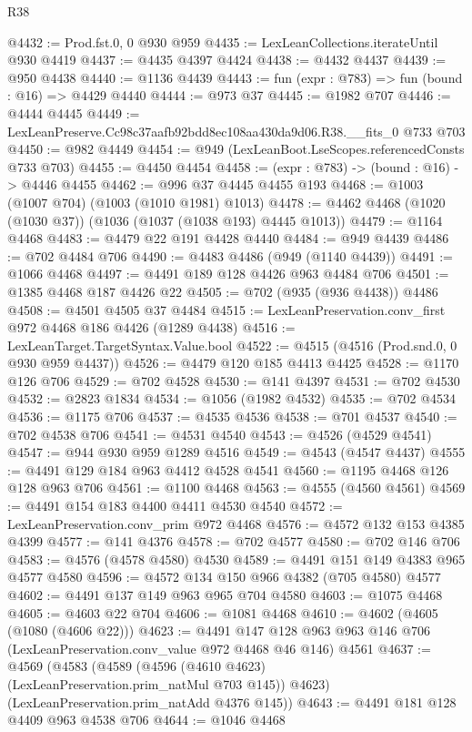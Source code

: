 \begin{lexlean}{R38}
\begin{coremodule}
@4432 := Prod.fst.{0, 0} @930 @959
@4435 := LexLeanCollections.iterateUntil @930 @4419
@4437 := @4435 @4397 @4424
@4438 := @4432 @4437
@4439 := @950 @4438
@4440 := @1136 @4439
@4443 := fun (expr : @783) => fun (bound : @16) => @4429 @4440
@4444 := @973 @37
@4445 := @1982 @707
@4446 := @4444 @4445
@4449 := LexLeanPreserve.Cc98c37aafb92bdd8ec108aa430da9d06.R38.__fits_0 @733 @703
@4450 := @982 @4449
@4454 := @949 (LexLeanBoot.LseScopes.referencedConsts @733 @703)
@4455 := @4450 @4454
@4458 := (expr : @783) -> (bound : @16) -> @4446 @4455
@4462 := @996 @37 @4445 @4455 @193
@4468 := @1003 (@1007 @704) (@1003 (@1010 @1981) @1013)
@4478 := @4462 @4468 (@1020 (@1030 @37)) (@1036 (@1037 (@1038 @193) @4445 @1013))
@4479 := @1164 @4468
@4483 := @4479 @22 @191 @4428 @4440
@4484 := @949 @4439
@4486 := @702 @4484 @706
@4490 := @4483 @4486 (@949 (@1140 @4439))
@4491 := @1066 @4468
@4497 := @4491 @189 @128 @4426 @963 @4484 @706
@4501 := @1385 @4468 @187 @4426 @22
@4505 := @702 (@935 (@936 @4438)) @4486
@4508 := @4501 @4505 @37 @4484
@4515 := LexLeanPreservation.conv_first @972 @4468 @186 @4426 (@1289 @4438)
@4516 := LexLeanTarget.TargetSyntax.Value.bool
@4522 := @4515 (@4516 (Prod.snd.{0, 0} @930 @959 @4437))
@4526 := @4479 @120 @185 @4413 @4425
@4528 := @1170 @126 @706
@4529 := @702 @4528
@4530 := @141 @4397
@4531 := @702 @4530
@4532 := @2823 @1834
@4534 := @1056 (@1982 @4532)
@4535 := @702 @4534
@4536 := @1175 @706
@4537 := @4535 @4536
@4538 := @701 @4537
@4540 := @702 @4538 @706
@4541 := @4531 @4540
@4543 := @4526 (@4529 @4541)
@4547 := @944 @930 @959 @1289 @4516
@4549 := @4543 (@4547 @4437)
@4555 := @4491 @129 @184 @963 @4412 @4528 @4541
@4560 := @1195 @4468 @126 @128 @963 @706
@4561 := @1100 @4468
@4563 := @4555 (@4560 @4561)
@4569 := @4491 @154 @183 @4400 @4411 @4530 @4540
@4572 := LexLeanPreservation.conv_prim @972 @4468
@4576 := @4572 @132 @153 @4385 @4399
@4577 := @141 @4376
@4578 := @702 @4577
@4580 := @702 @146 @706
@4583 := @4576 (@4578 @4580) @4530
@4589 := @4491 @151 @149 @4383 @965 @4577 @4580
@4596 := @4572 @134 @150 @966 @4382 (@705 @4580) @4577
@4602 := @4491 @137 @149 @963 @965 @704 @4580
@4603 := @1075 @4468
@4605 := @4603 @22 @704
@4606 := @1081 @4468
@4610 := @4602 (@4605 (@1080 (@4606 @22)))
@4623 := @4491
    @147
    @128
    @963
    @963
    @146
    @706
    (LexLeanPreservation.conv_value @972 @4468 @46 @146)
    @4561
@4637 := @4569
    (@4583
      (@4589 (@4596 (@4610 @4623) (LexLeanPreservation.prim_natMul @703 @145)) @4623)
      (LexLeanPreservation.prim_natAdd @4376 @145))
@4643 := @4491 @181 @128 @4409 @963 @4538 @706
@4644 := @1046 @4468

\end{coremodule}
\end{lexlean}
